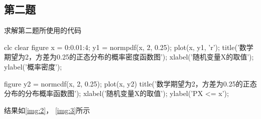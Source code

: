 \documentclass{article}
\begin{document}
\subsection{第二题}
求解第二题所使用的代码
\begin{matlabcode}

    clc
    clear
    figure
    x = 0:0.01:4;
    y1 = normpdf(x, 2, 0.25);
    plot(x, y1, 'r');
    title('数学期望为2，方差为0.25的正态分布的概率密度函数图');
    xlabel('随机变量X的取值');
    ylabel('概率密度');

    figure
    y2 = normcdf(x, 2, 0.25);
    plot(x, y2)
    title('数学期望为2，方差为0.25的正态分布的分布概率函数图');
    xlabel('随机变量X的取值');
    ylabel('P{X <= x}');

\end{matlabcode}

结果如\autoref{img:2}， \autoref{img:3}所示
\end{document}

